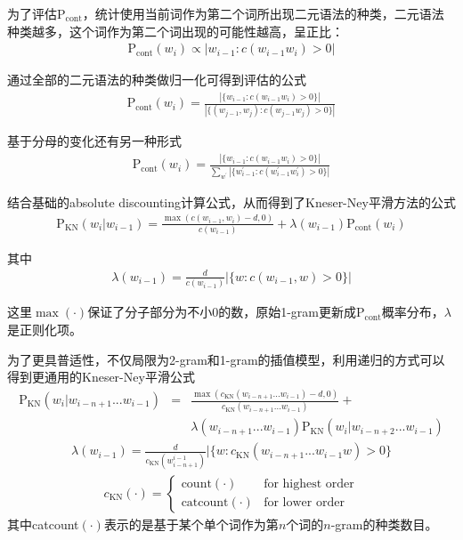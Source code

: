 \parinterval 为了评估$\textrm{P}_{\textrm{cont}}$，统计使用当前词作为第二个词所出现二元语法的种类，二元语法种类越多，这个词作为第二个词出现的可能性越高，呈正比：
\begin{eqnarray}
\textrm{P}_{\textrm{cont}}(w_i) \varpropto |w_{i-1}: c(w_{i-1} w_i )>0|
\label{eq:2-34}
\end{eqnarray}

通过全部的二元语法的种类做归一化可得到评估的公式
\begin{eqnarray}
\textrm{P}_{\textrm{cont}}(w_i) = \frac{|\{ w_{i-1}:c(w_{i-1} w_i )>0 \}|}{|\{ (w_{j-1}, w_j):c(w_{j-1}w_j )>0 \}|}
\label{eq:2-35}
\end{eqnarray}

\parinterval 基于分母的变化还有另一种形式
\begin{eqnarray}
\textrm{P}_{\textrm{cont}}(w_i) = \frac{|\{ w_{i-1}:c(w_{i-1} w_i )>0 \}|}{\sum_{w^{\prime}}|\{ w_{i-1}^{\prime}:c(w_{i-1}^{\prime} w_i^{\prime} )>0 \}|}
\label{eq:2-36}
\end{eqnarray}

结合基础的absolute discounting计算公式，从而得到了Kneser-Ney平滑方法的公式
\begin{eqnarray}
\textrm{P}_{\textrm{KN}}(w_i|w_{i-1}) = \frac{\max(c(w_{i-1},w_i )-d,0)}{c(w_{i-1})}+ \lambda(w_{i-1})\textrm{P}_{\textrm{cont}}(w_i)
\label{eq:2-37}
\end{eqnarray}

\noindent 其中
\begin{eqnarray}
\lambda(w_{i-1}) = \frac{d}{c(w_{i-1})}|\{w:c(w_{i-1},w)>0\}|
\label{eq:2-38}
\end{eqnarray}

\noindent 这里$\max(\cdot)$保证了分子部分为不小0的数，原始1-gram更新成$\textrm{P}_{\textrm{cont}}$概率分布，$\lambda$是正则化项。

\parinterval 为了更具普适性，不仅局限为2-gram和1-gram的插值模型，利用递归的方式可以得到更通用的Kneser-Ney平滑公式
\begin{eqnarray}
\textrm{P}_{\textrm{KN}}(w_i|w_{i-n+1} ...w_{i-1}) & = & \frac{\max(c_{\textrm{KN}}(w_{i-n+1}...w_{i-1})-d,0)}{c_{\textrm{KN}}(w_{i-n+1}...w_{i-1})} + \nonumber \\
                                                   &   &  \lambda(w_{i-n+1}...w_{i-1})\textrm{P}_{\textrm{KN}}(w_i|w_{i-n+2}...w_{i-1})
\label{eq:2-39}
\end{eqnarray}
\begin{eqnarray}
\lambda(w_{i-1}) =  \frac{d}{c_{\textrm{KN}}(w_{i-n+1}^{i-1})}|\{w:c_{\textrm{KN}}(w_{i-n+1}...w_{i-1}w)>0\}
\label{eq:2-40}
\end{eqnarray}
\begin{eqnarray}
c_{\textrm{KN}}(\cdot) = \left\{\begin{array}{ll}
\textrm{count}(\cdot) & \textrm{for\ highest\ order}  \\
\textrm{catcount}(\cdot) & \textrm{for\ lower\ order}
\end{array}\right.
\label{eq:2-41}
\end{eqnarray}
\noindent 其中catcount$(\cdot)$表示的是基于某个单个词作为第$n$个词的$n$-gram的种类数目。

